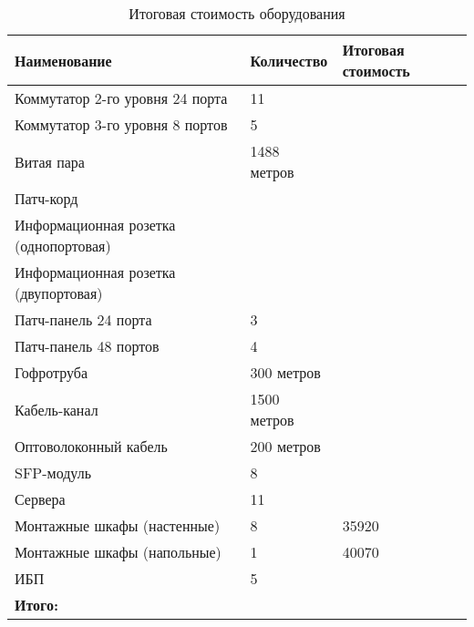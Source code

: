 \begin{table}[!htbp]
  \centering
  \begin{tabular}{|p{3cm}|p{2cm}|p{2cm}|}
    \hline
    Наименование & Количество & Итоговая стоимость \\ \hline
    Коммутатор 2-го уровня 24 порта & 11 & \\ \hline
    Коммутатор 3-го уровня 8 портов & 5 & \\ \hline
    Витая пара & 1488 метров & \\ \hline
    Патч-корд & & \\ \hline
    Информационная розетка (однопортовая) & & \\ \hline
    Информационная розетка (двупортовая) & & \\ \hline
    Патч-панель 24 порта & 3 & \\ \hline
    Патч-панель 48 портов & 4 & \\ \hline
    Гофротруба & 300 метров & \\ \hline
    Кабель-канал & 1500 метров & \\ \hline
    Оптоволоконный кабель & 200 метров & \\ \hline
    SFP-модуль & 8 & \\ \hline
    Сервера & 11 & \\ \hline
    Монтажные шкафы (настенные) & 8 & 35920 \\ \hline
    Монтажные шкафы (напольные) & 1 & 40070 \\ \hline
    ИБП & 5 & \\ \hline
    \textbf{Итого:} & & \\ \hline
  \end{tabular}
  \caption{Итоговая стоимость оборудования}
  \label{table:cabel}
\end{table}